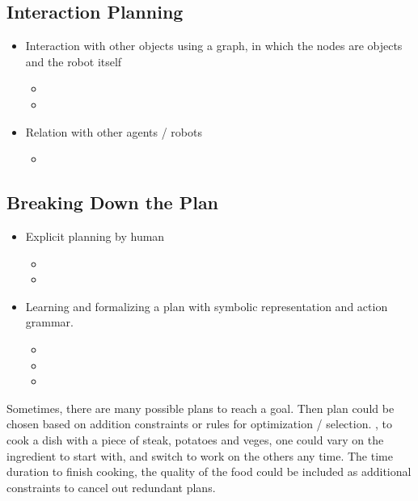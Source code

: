 \subsection{Interaction Planning}
\begin{itemize}
	\item Interaction with other objects using a graph, in which the nodes are objects and the robot itself
	\begin{itemize}
		\item {}
		\item {}
	\end{itemize}
	\item Relation with other agents / robots
	\begin{itemize}
		\item {}
	\end{itemize}
\end{itemize}

\subsection{Breaking Down the Plan}
\begin{itemize}
	\item Explicit planning by human
	\begin{itemize}
		\item {}
		\item {}		
	\end{itemize}
	\item Learning and formalizing a plan with symbolic representation and action grammar.
	\begin{itemize}
		\item {}
		\item {}				
		\item {}
	\end{itemize}
\end{itemize}

Sometimes, there are many possible plans to reach a goal. Then plan could be chosen based on addition constraints or rules for optimization / selection. \Eg, to cook a dish with a piece of steak, potatoes and veges, one could vary on the ingredient to start with, and switch to work on the others any time. The time duration to finish cooking, the quality of the food could be included as additional constraints to cancel out redundant plans.


